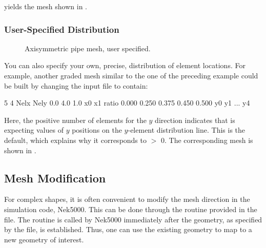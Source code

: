 \documentclass[letterpaper,10pt,english]{sphinxmanual}
\begin{document}
yields the mesh shown in .


\subsubsection{User-Specified Distribution}
\label{\detokenize{appendix:user-specified-distribution}}
\begin{figure}[htbp]
\centering
\capstart

\noindent{}
\caption{Axisymmetric pipe mesh, user specified.}\label{\detokenize{appendix:fig-mesh-axi3}}\label{\detokenize{appendix:id5}}\end{figure}

You can also specify your own, precise, distribution of element
locations.   For example, another graded mesh similar to the
one of the preceding example could be built by changing the
 input file to contain:

%
\begin{sphinxVerbatim}[commandchars=\\\{\}]
\PYGZhy{}5  4                                               Nelx  Nely
0.0   4.0   1.0                                     x0  x1   ratio
0.000    0.250    0.375    0.450    0.500           y0  y1 ... y4
\end{sphinxVerbatim}

Here, the positive number of elements for the \(y\) direction indicates
that  is expecting  values of \(y\) positions on the
\(y\)-element distribution line.   This is the  default, which
explains why it corresponds to  \(>\) 0.  The corresponding mesh
is shown in .


\subsection{Mesh Modification}
\label{\detokenize{appendix:mesh-modification}}
For complex shapes, it is often convenient to modify the mesh
direction in the simulation code, Nek5000.  This can be done
through the  routine provided in the  file.
The routine  is called by Nek5000 immediately after
the geometry, as specified by the  file, is established.
Thus, one can use the existing geometry to map to a new geometry
of interest.
\end{document}
